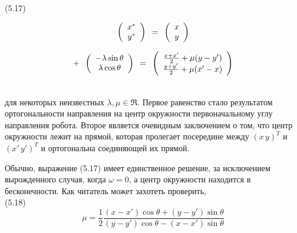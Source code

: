\documentclass[10pt,a4paper]{article}
\begin{document}
(5.17)
\begin{minipage}{0.3\textwidth}
	\begin{equation*}
	\left(\begin{array}{c}
	x^*\\
	y^*\\
	\end{array}\right)
	\hspace{2mm}
	\mbox {=} \hspace{2mm}\left(\begin{array}{c}
	x\\
	y\\
	\end{array}\right)
	\end{equation*}
\end{minipage}
\begin{minipage}{0.3\textwidth}
	\begin{equation*}
	\mbox {+} \hspace{2mm} 
	\left(\begin{array}{c}
	-\lambda\sin\theta\\
	\lambda\cos\theta\\
	\end{array}\right)
	\hspace{2mm}
	\mbox {=} \hspace{2mm}\left(\begin{array}{c}
	\frac{x+x'}{2}+\mu(y-y')\\
	\frac{y+y'}{2}+\mu(x'-x)\\
	\end{array}\right)
	\end{equation*}
\end{minipage}\\

для некоторых неизвестных $\lambda,\mu\in\Re$. Первое равенство стало результатом ортогональности направления на центр окружности первоначальному углу направления робота. Второе является очевидным заключением о том, что центр окружности лежит на прямой, которая пролегает посередине между
$(x\,y)^T$ и $(x'\,y')^T$ и ортогональна соединяющей их прямой.

Обычно, выражение (5.17) имеет единственное решение, за исключением вырожденного случая, когда $\omega=0$, а центр окружности находится в бесконечности. Как читатель может захотеть проверить,\\

(5.18)
$$\mu=\frac{1}{2}\frac{(x-x')\cos\theta+(y-y')\sin\theta}{(y-y')\cos\theta-(x-x')\sin\theta}$$
\end{document}
